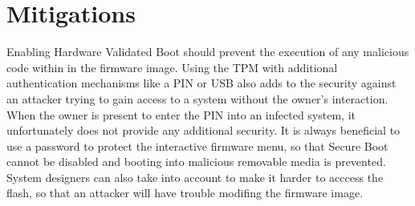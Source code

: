 










\section{Mitigations}

Enabling Hardware Validated Boot should prevent the execution of any malicious code within in the firmware image.
Using the \ac{TPM} with additional authentication mechanisms like a \ac{PIN} or \ac{USB} also adds to the security against an attacker trying to gain access to a system without the owner's interaction.
When the owner is present to enter the \ac{PIN} into an infected system, it unfortunately does not provide any additional security.
It is always beneficial to use a password to protect the interactive firmware menu, so that Secure Boot cannot be disabled and booting into malicious removable media is prevented.
System designers can also take into account to make it harder to acccess the flash, so that an attacker will have trouble modifing the firmware image.
